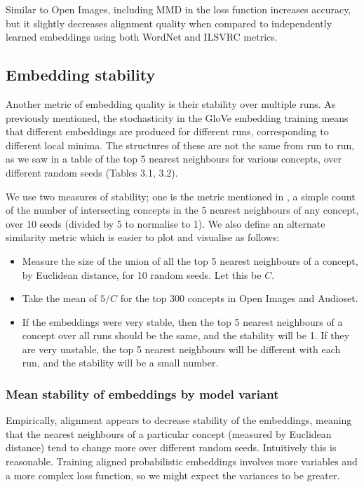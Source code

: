 Similar to Open Images, including MMD in the loss function increases accuracy, but it slightly decreases alignment quality when compared to independently learned embeddings using both WordNet and ILSVRC metrics. 

\subsection{Embedding stability}

Another metric of embedding quality is their stability over multiple runs. As previously mentioned, the stochasticity in the GloVe embedding training means that different embeddings are produced for different runs, corresponding to different local minima. The structures of these are not the same from run to run, as we saw in a table of the top 5 nearest neighbours for various concepts, over different random seeds (Tables 3.1, 3.2). %

We use two measures of stability; one is the metric mentioned in \cite{WordEmbeddingStability}, a simple count of the number of intersecting concepts in the 5 nearest neighbours of any concept, over 10 seeds (divided by 5 to normalise to 1). We also define an alternate similarity metric which is easier to plot and visualise as follows:

\begin{itemize}
    \item Measure the size of the union of all the top 5 nearest neighbours of a concept, by Euclidean distance, for 10 random seeds. Let this be $C$. 
    \item Take the mean of $5/C$ for the top 300 concepts in Open Images and Audioset.
    \item If the embeddings were very stable, then the top 5 nearest neighbours of a concept over all runs should be the same, and the stability will be 1. If they are very unstable, the top 5 nearest neighbours will be different with each run, and the stability will be a small number. 
\end{itemize}

\subsubsection{Mean stability of embeddings by model variant}

Empirically, alignment appears to decrease stability of the embeddings, meaning that the nearest neighbours of a particular concept (measured by Euclidean distance) tend to change more over different random seeds. Intuitively this is reasonable. Training aligned probabilistic embeddings involves more variables and a more complex loss function, so we might expect the variances to be greater. 

